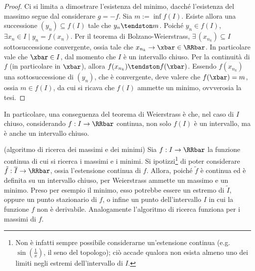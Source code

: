 \documentclass[11pt]{article}
\begin{document}
	\begin{proof}
		Ci si limita a dimostrare l'esistenza del minimo, dacché l'esistenza
		del massimo segue dal considerare $g = -f$. Sia $m := \inf f(I)$.
		Esiste allora una successione $(y_n) \subseteq f(I)$ tale che
		$y_n \tendston m$. Poiché $y_n \in f(I)$, $\exists x_n \in I \mid
		y_n = f(x_n)$. Per il teorema di Bolzano-Weierstrass, $\exists \, (x_{n_k})
		\subseteq I$ sottosuccessione convergente, ossia tale che
		$x_{n_k} \to \xbar \in \RRbar$. In particolare vale che
		$\xbar \in I$, dal momento che $I$ è un intervallo chiuso. %
		Per la continuità di $f$ (in particolare in $\xbar$), allora $f(x_{n_k}) \tendston f(\xbar)$.
		Essendo $f(x_{n_k})$ una sottosuccessione di $(y_n)$, che è
		convergente, deve valere che $f(\xbar) = m$, ossia
		$m \in f(I)$, da cui si ricava che $f(I)$ ammette un minimo,
		ovvverosia la tesi.
	\end{proof}

	\begin{remark}
		In particolare, una conseguenza del teorema di Weierstrass è che, nel caso di $I$ chiuso,
		considerando $f : I \to \RRbar$ continua, non solo $f(I)$ è un intervallo, ma è anche un
		intervallo chiuso.
	\end{remark}
	
	\begin{remark} (algoritmo di ricerca dei massimi e dei minimi) Sia $f : I \to \RRbar$ la funzione continua di cui si
		ricerca i massimi e i minimi. Si ipotizzi\footnote{Non è infatti sempre possibile considerarne un'estensione continua (e.g.~$\sin(\frac1{x})$, il seno del topologo); ciò accade qualora non esista almeno uno dei limiti negli estremi dell'intervallo di $I$.} di poter considerare $\tilde{f} : \overline{I} \to \RRbar$, ossia l'estensione
		continua di $f$. Allora, poiché $\tilde{f}$ è continua ed è definita su
		un intervallo chiuso, per Weierstrass ammette un massimo e un
		minimo. Preso per esempio il minimo, esso potrebbe essere un
		estremo di $\tilde{I}$, oppure un punto stazionario di $f$, o infine un punto dell'intervallo $I$ in cui
		la funzione $f$ non è derivabile. Analogamente l'algoritmo di ricerca funziona per i massimi di $f$.
	\end{remark}
	
\end{document}
